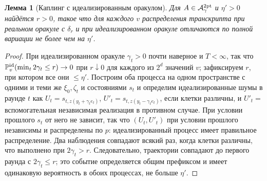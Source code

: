 \documentclass[11pt,a4paper]{article}
\numberwithin{equation}{section}
\newtheorem{lemma}[theorem]{Лемма}
\theoremstyle{definition}
\theoremstyle{remark}
\begin{document}
\begin{lemma}[Каплинг с идеализированным оракулом]\label{lem:couple}
Для $A\in\mathcal A^{\rm 2pt}_\gamma$ и $\eta'>0$ найдётся $r>0$, такое что для каждого $v$ распределения транскрипта при реальном оракуле с $\delta_r$ и при идеализированном оракуле отличаются по полной вариации не более чем на $\eta'$.
\end{lemma}
\begin{proof}
При идеализированном оракуле $\gamma_t>0$ почти наверное и $T<\infty$, так что $\mathbb P^{\rm id}_v(\min_t2\gamma_t\le r)\to0$ при $r\downarrow0$ для каждого из $2^d$ значений $v$; зафиксируем $r$, при котором все они $\le\eta'$. Построим оба процесса на одном пространстве с одними и теми же $\xi_0,\zeta_t$ и состояниями $s_t$ и определим идеализированные шумы в раунде $t$ как $U_t=s_{t,z(y_t+\gamma_te_t)}$, $U'_t=s_{t,z(y_t-\gamma_te_t)}$, если клетки различны, и $U'_t=$ вспомогательная независимая реализация в противном случае. При условии прошлого $s_t$ от него не зависит, так что $(U_t,U'_t)$ при условии прошлого независимы и распределены по $p$: идеализированный процесс имеет правильное распределение. Два наблюдения совпадают всякий раз, когда клетки различны, что выполнено при $2\gamma_t>r$. Следовательно, траектории совпадают до первого раунда с $2\gamma_t\le r$; это событие определяется общим префиксом и имеет одинаковую вероятность в обоих процессах, не больше $\eta'$.
\end{proof}
\end{document}

